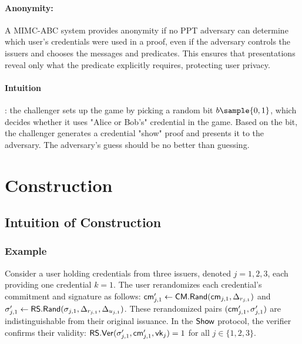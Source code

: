 \paragraph{Anonymity: }A MIMC-ABC system provides anonymity if no PPT adversary can determine which user’s credentials were used in a proof, even if the adversary controls the issuers and chooses the messages and predicates. This ensures that presentations reveal only what the predicate explicitly requires, protecting user privacy.

\paragraph{Intuition}: the challenger sets up the game by picking a random bit $b \sample \bit$, which decides whether it uses "Alice or Bob's" credential in the game. Based on the bit, the challenger generates a credential "show" proof and presents it to the adversary. The adversary's guess should be no better than guessing.


























\newpage
\section{Construction}

\subsection{Intuition of Construction}

\subsubsection{Example}
Consider a user holding credentials from three issuers, denoted $j = 1, 2, 3$, each providing one credential $k = 1$. The user rerandomizes each credential’s commitment and signature as follows: $\mathsf{cm}_{j,1}' \gets \mathsf{CM.Rand}(\mathsf{cm}_{j,1}, \Delta_{r_{j,1}})$ and $\sigma_{j,1}' \gets \mathsf{RS.Rand}(\sigma_{j,1}, \Delta_{r_{j,1}}, \Delta_{u_{j,1}})$. These rerandomized pairs $(\mathsf{cm}_{j,1}', \sigma_{j,1}')$ are indistinguishable from their original issuance. In the $\mathsf{Show}$ protocol, the verifier confirms their validity: $\mathsf{RS.Ver}(\sigma_{j,1}', \mathsf{cm}_{j,1}', \mathsf{vk}_j) = 1$ for all $j \in \{1, 2, 3\}$.

